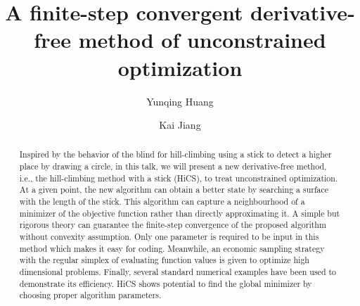 \documentclass[final,1p,times]{elsarticle}
\begin{document}
\begin{frontmatter}

\title{A finite-step convergent derivative-free method of unconstrained optimization}




\author[xtu]{Yunqing Huang }


\author[xtu]{Kai Jiang }


\address[xtu]{School of Mathematics and Computational
 Science, 
 \\
Hunan Key Laboratory for Computation and Simulation in Science
and Engineering, Xiangtan University, P.R. China, 411105
 }


\begin{abstract}
Inspired by the behavior of the blind for hill-climbing using a
stick to detect a higher place by drawing a circle,
in this talk, we will present a new derivative-free method, i.e.,
the hill-climbing method with a stick (HiCS), to treat
unconstrained optimization.
At a given point, the new algorithm can obtain a better state
by searching a surface with the length of the stick.
This algorithm can capture a neighbourhood of a minimizer of the objective function
rather than directly approximating it.
A simple but rigorous theory can guarantee the 
finite-step convergence of the proposed algorithm without convexity assumption. 
Only one parameter is required to be input in this method which makes it easy for coding.
Meanwhile, an economic sampling strategy with the
regular simplex of evaluating function values is given to
optimize high dimensional problems.
Finally, several standard numerical examples have been used to demonstrate its efficiency.
HiCS shows potential to find the global minimizer by choosing
proper algorithm parameters.
\end{abstract}


\end{frontmatter}
\end{document}
